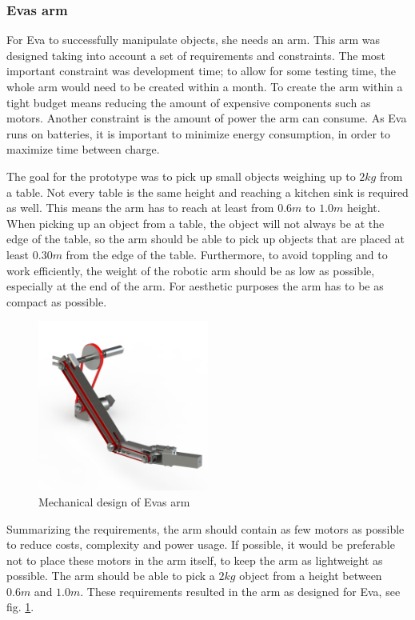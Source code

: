 \documentclass[project_eva.tex]{subfiles}
\begin{document}
\subsubsection*{Eva\textquotesingle s arm}
For Eva to successfully manipulate objects, she needs an arm. This arm was designed taking into account a set of 
requirements and constraints. The most important constraint was development time; to allow for some testing time, the 
whole arm would need to be created within a month. To create the arm within a tight budget means reducing the amount of 
expensive components such as motors. Another constraint is the amount of power the arm can consume. As Eva runs on 
batteries, it is important to minimize energy consumption, in order to maximize time between charge.

The goal for the prototype was to pick up small objects weighing up to $2kg$ from a table. Not every table is the same 
height and reaching a kitchen sink is required as well. This means the arm has to reach at least from $0.6m$ to $1.0m$ 
height. When picking up an object from a table, the object will not always be at the edge of the table, so the arm should 
be able to pick up objects that are placed at least $0.30m$ from the edge of the table. Furthermore, to avoid toppling 
and to work efficiently, the weight of the robotic arm should be as low as possible, especially at the end of the arm. 
For aesthetic purposes the arm has to be as compact as possible.

\begin{figure}[h]
	\centering
	\mbox{\includegraphics[width=0.5\textwidth]{Images/armMechOverview.png}}
	\caption{Mechanical design of Eva\textquotesingle s arm}
	\label{fig:armMechOverview}
\end{figure}

Summarizing the requirements, the arm should contain as few motors as possible to reduce costs, complexity and power 
usage. If possible, it would be preferable not to place these motors in the arm itself, to keep the arm as lightweight as 
possible. The arm should be able to pick a $2kg$ object from a height between $0.6m$ and $1.0m$. These requirements 
resulted in the arm as designed for Eva, see fig. \ref{fig:armMechOverview}.
\end{document}
